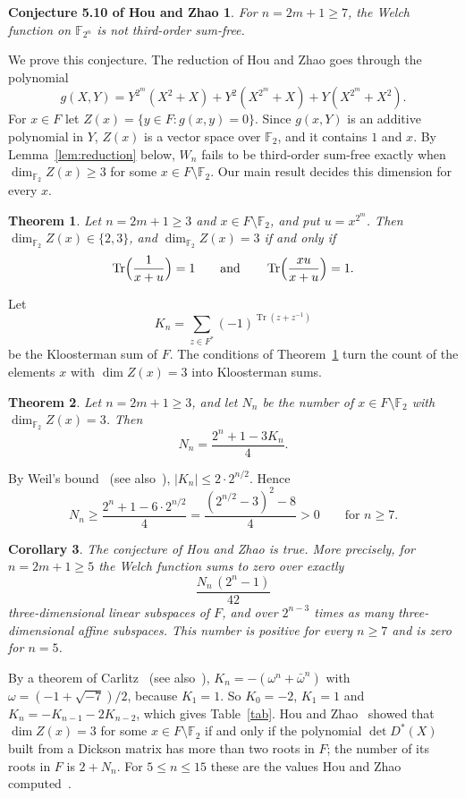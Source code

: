 \documentclass[11pt,a4paper,reqno]{amsart}
\newtheorem{theorem}{Theorem}[section]
\newtheorem{corollary}[theorem]{Corollary}
\newtheorem*{conjHZ}{Conjecture 5.10 of Hou and Zhao}
\theoremstyle{remark}
\numberwithin{equation}{section}
\newcommand{\F}{\mathbb{F}}
\newcommand{\Tr}{\operatorname{Tr}}
\begin{document}
\begin{conjHZ}
For $n=2m+1\ge7$, the Welch function on $\F_{2^n}$ is not third-order sum-free.
\end{conjHZ}

We prove this conjecture. The reduction of Hou and Zhao goes through the polynomial
\begin{equation}\label{eq:g}
g(X,Y)=Y^{2^m}(X^2+X)+Y^2(X^{2^m}+X)+Y(X^{2^m}+X^2).
\end{equation}
For $x\in F$ let $Z(x)=\{y\in F: g(x,y)=0\}$. Since $g(x,Y)$ is an additive polynomial in $Y$, $Z(x)$ is a vector space over $\F_2$, and it contains $1$ and $x$. By Lemma~\ref{lem:reduction} below, $W_n$ fails to be third-order sum-free exactly when $\dim_{\F_2}Z(x)\ge3$ for some $x\in F\setminus\F_2$. Our main result decides this dimension for every $x$.

\begin{theorem}\label{thm:criterion}
Let $n=2m+1\ge3$ and $x\in F\setminus\F_2$, and put $u=x^{2^m}$. Then $\dim_{\F_2}Z(x)\in\{2,3\}$, and $\dim_{\F_2}Z(x)=3$ if and only if
\[
\Tr\Bigl(\frac{1}{x+u}\Bigr)=1\qquad\text{and}\qquad\Tr\Bigl(\frac{xu}{x+u}\Bigr)=1 .
\]
\end{theorem}

Let
\[
K_n=\sum_{z\in F^*}(-1)^{\Tr(z+z^{-1})}
\]
be the Kloosterman sum of $F$. The conditions of Theorem~\ref{thm:criterion} turn the count of the elements $x$ with $\dim Z(x)=3$ into Kloosterman sums.

\begin{theorem}\label{thm:count}
Let $n=2m+1\ge3$, and let $N_n$ be the number of $x\in F\setminus\F_2$ with $\dim_{\F_2}Z(x)=3$. Then
\[
N_n=\frac{2^n+1-3K_n}{4}.
\]
\end{theorem}

By Weil's bound~\cite{Weil} (see also~\cite[Chapter~5]{LN}), $|K_n|\le2\cdot2^{n/2}$. Hence
\[
N_n\ge\frac{2^n+1-6\cdot2^{n/2}}{4}=\frac{(2^{n/2}-3)^2-8}{4}>0\qquad\text{for }n\ge7 .
\]

\begin{corollary}\label{cor:conj}
The conjecture of Hou and Zhao is true. More precisely, for $n=2m+1\ge5$ the Welch function sums to zero over exactly
\[
\frac{N_n\,(2^n-1)}{42}
\]
three-dimensional linear subspaces of $F$, and over $2^{n-3}$ times as many three-dimensional affine subspaces. This number is positive for every $n\ge7$ and is zero for $n=5$.
\end{corollary}

By a theorem of Carlitz~\cite{Carlitz} (see also~\cite[Chapter~5]{LN}), $K_n=-(\omega^n+\bar\omega^n)$ with $\omega=(-1+\sqrt{-7})/2$, because $K_1=1$. So $K_0=-2$, $K_1=1$ and $K_n=-K_{n-1}-2K_{n-2}$, which gives Table~\ref{tab}. Hou and Zhao~\cite[Corollary~5.9]{HZ} showed that $\dim Z(x)=3$ for some $x\in F\setminus\F_2$ if and only if the polynomial $\det D^*(X)$ built from a Dickson matrix has more than two roots in $F$; the number of its roots in $F$ is $2+N_n$. For $5\le n\le15$ these are the values Hou and Zhao computed~\cite[Table~1]{HZ}.
\end{document}
